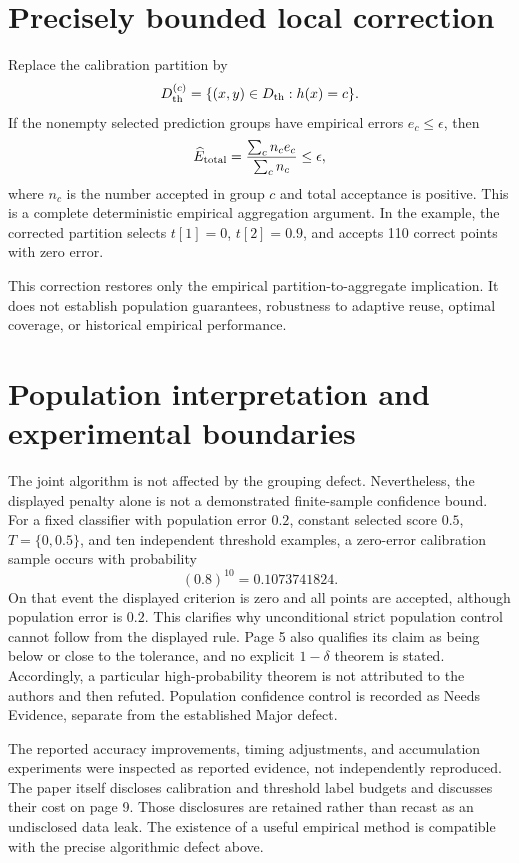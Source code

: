\documentclass[10pt]{article}
\begin{document}
\section*{Precisely bounded local correction}
Replace the calibration partition by \[D_{\rm th}^{(c)}=\{(x,y)\in D_{\rm th}:h(x)=c\}.\] If the nonempty selected prediction groups have empirical errors \(e_c\leq\epsilon\), then \[\widehat E_{\rm total}
 =\frac{\sum_c n_c e_c}{\sum_c n_c}
 \leq\epsilon ,\] where \(n_c\) is the number accepted in group \(c\) and total acceptance is positive. This is a complete deterministic empirical aggregation argument. In the example, the corrected partition selects \(t[1]=0\), \(t[2]=0.9\), and accepts 110 correct points with zero error.\par
This correction restores only the empirical partition-to-aggregate implication. It does not establish population guarantees, robustness to adaptive reuse, optimal coverage, or historical empirical performance.\par
\section*{Population interpretation and experimental boundaries}
The joint algorithm is not affected by the grouping defect. Nevertheless, the displayed penalty alone is not a demonstrated finite-sample confidence bound. For a fixed classifier with population error \(0.2\), constant selected score \(0.5\), \(T=\{0,0.5\}\), and ten independent threshold examples, a zero-error calibration sample occurs with probability \[(0.8)^{10}=0.1073741824.\] On that event the displayed criterion is zero and all points are accepted, although population error is \(0.2\). This clarifies why unconditional strict population control cannot follow from the displayed rule. Page 5 also qualifies its claim as being below or close to the tolerance, and no explicit \(1-\delta\) theorem is stated. Accordingly, a particular high-probability theorem is not attributed to the authors and then refuted. Population confidence control is recorded as Needs Evidence, separate from the established Major defect.\par
The reported accuracy improvements, timing adjustments, and accumulation experiments were inspected as reported evidence, not independently reproduced. The paper itself discloses calibration and threshold label budgets and discusses their cost on page 9. Those disclosures are retained rather than recast as an undisclosed data leak. The existence of a useful empirical method is compatible with the precise algorithmic defect above.\par
\end{document}
